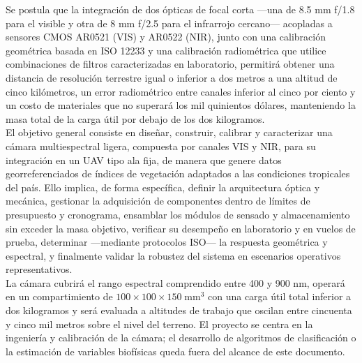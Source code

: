 \noindent Se postula que la integración de dos ópticas de focal corta —una de
8.5 mm f/1.8 para el visible y otra de 8 mm f/2.5 para el infrarrojo
cercano— acopladas a sensores CMOS AR0521 (VIS) y AR0522 (NIR), junto
con una calibración geométrica basada en ISO 12233 y una calibración
radiométrica que utilice combinaciones de filtros caracterizadas en
laboratorio, permitirá obtener una distancia de resolución terrestre
igual o inferior a dos metros a una altitud de cinco kilómetros, un
error radiométrico entre canales inferior al cinco por ciento y un costo
de materiales que no superará los mil quinientos dólares, manteniendo la
masa total de la carga útil por debajo de los dos kilogramos.\\

\noindent El objetivo general consiste en diseñar, construir, calibrar y
caracterizar una cámara multiespectral ligera, compuesta por canales
VIS y NIR, para su integración en un UAV tipo ala fija, de manera que
genere datos georreferenciados de índices de vegetación adaptados a las
condiciones tropicales del país.  Ello implica, de forma específica,
definir la arquitectura óptica y mecánica, gestionar la adquisición de
componentes dentro de límites de presupuesto y cronograma, ensamblar los
módulos de sensado y almacenamiento sin exceder la masa objetivo,
verificar su desempeño en laboratorio y en vuelos de prueba,
determinar —mediante protocolos ISO— la respuesta geométrica y
espectral, y finalmente validar la robustez del sistema en escenarios
operativos representativos.\\

\noindent La cámara cubrirá el rango espectral comprendido entre 400 y 900 nm,
operará en un compartimiento de \(100\times100\times150\;\text{mm}^3\)
con una carga útil total inferior a dos kilogramos y será evaluada a
altitudes de trabajo que oscilan entre cincuenta y cinco mil metros
sobre el nivel del terreno.  El proyecto se centra en la ingeniería y
calibración de la cámara; el desarrollo de algoritmos de clasificación o
la estimación de variables biofísicas queda fuera del alcance de este
documento.\\

